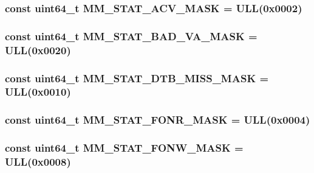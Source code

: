 \label{namespaceAlphaISA_a85596e9220b88ac7b8d5045e67e0c8d9}
\hypertarget{namespaceAlphaISA_a0affe5a0a033bf0f88646d2f683935be}{
\subsubsection[{MM\_\-STAT\_\-ACV\_\-MASK}]{\setlength{\rightskip}{0pt plus 5cm}const uint64\_\-t {\bf MM\_\-STAT\_\-ACV\_\-MASK} = ULL(0x0002)}}
\label{namespaceAlphaISA_a0affe5a0a033bf0f88646d2f683935be}
\hypertarget{namespaceAlphaISA_a4b5e389d1116e4dbfd4d9c3e918d87cf}{
\subsubsection[{MM\_\-STAT\_\-BAD\_\-VA\_\-MASK}]{\setlength{\rightskip}{0pt plus 5cm}const uint64\_\-t {\bf MM\_\-STAT\_\-BAD\_\-VA\_\-MASK} = ULL(0x0020)}}
\label{namespaceAlphaISA_a4b5e389d1116e4dbfd4d9c3e918d87cf}
\hypertarget{namespaceAlphaISA_ad307c833a813184d15a18a5063358916}{
\subsubsection[{MM\_\-STAT\_\-DTB\_\-MISS\_\-MASK}]{\setlength{\rightskip}{0pt plus 5cm}const uint64\_\-t {\bf MM\_\-STAT\_\-DTB\_\-MISS\_\-MASK} = ULL(0x0010)}}
\label{namespaceAlphaISA_ad307c833a813184d15a18a5063358916}
\hypertarget{namespaceAlphaISA_aab1a75bed1961a122e6bb731b866cf27}{
\subsubsection[{MM\_\-STAT\_\-FONR\_\-MASK}]{\setlength{\rightskip}{0pt plus 5cm}const uint64\_\-t {\bf MM\_\-STAT\_\-FONR\_\-MASK} = ULL(0x0004)}}
\label{namespaceAlphaISA_aab1a75bed1961a122e6bb731b866cf27}
\hypertarget{namespaceAlphaISA_a0bd71744e6a29780f244bc897291ca57}{
\subsubsection[{MM\_\-STAT\_\-FONW\_\-MASK}]{\setlength{\rightskip}{0pt plus 5cm}const uint64\_\-t {\bf MM\_\-STAT\_\-FONW\_\-MASK} = ULL(0x0008)}}

